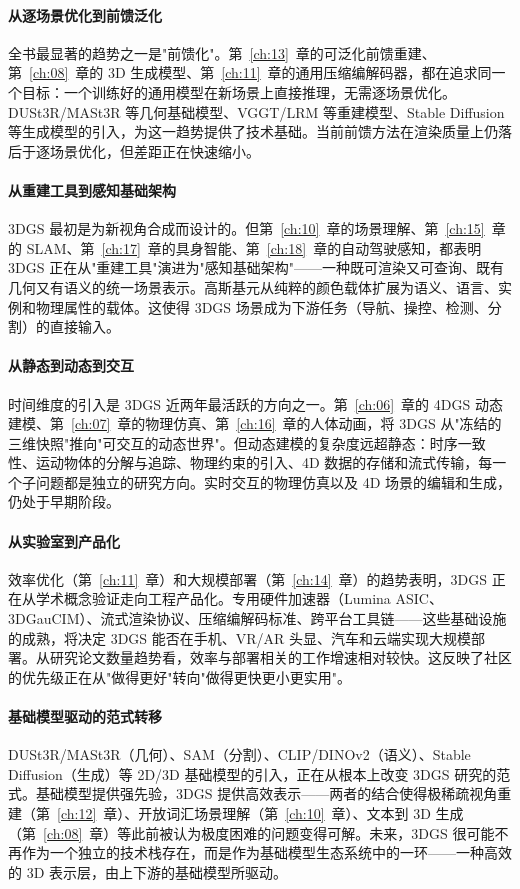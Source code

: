 \paragraph{从逐场景优化到前馈泛化}
全书最显著的趋势之一是"前馈化"。第~\ref{ch:13}~章的可泛化前馈重建、第~\ref{ch:08}~章的 3D 生成模型、第~\ref{ch:11}~章的通用压缩编解码器，都在追求同一个目标：一个训练好的通用模型在新场景上直接推理，无需逐场景优化。DUSt3R/MASt3R 等几何基础模型、VGGT/LRM 等重建模型、Stable Diffusion 等生成模型的引入，为这一趋势提供了技术基础。当前前馈方法在渲染质量上仍落后于逐场景优化，但差距正在快速缩小。

\paragraph{从重建工具到感知基础架构}
3DGS 最初是为新视角合成而设计的。但第~\ref{ch:10}~章的场景理解、第~\ref{ch:15}~章的 SLAM、第~\ref{ch:17}~章的具身智能、第~\ref{ch:18}~章的自动驾驶感知，都表明 3DGS 正在从"重建工具"演进为"感知基础架构"——一种既可渲染又可查询、既有几何又有语义的统一场景表示。高斯基元从纯粹的颜色载体扩展为语义、语言、实例和物理属性的载体。这使得 3DGS 场景成为下游任务（导航、操控、检测、分割）的直接输入。

\paragraph{从静态到动态到交互}
时间维度的引入是 3DGS 近两年最活跃的方向之一。第~\ref{ch:06}~章的 4DGS 动态建模、第~\ref{ch:07}~章的物理仿真、第~\ref{ch:16}~章的人体动画，将 3DGS 从"冻结的三维快照"推向"可交互的动态世界"。但动态建模的复杂度远超静态：时序一致性、运动物体的分解与追踪、物理约束的引入、4D 数据的存储和流式传输，每一个子问题都是独立的研究方向。实时交互的物理仿真以及 4D 场景的编辑和生成，仍处于早期阶段。

\paragraph{从实验室到产品化}
效率优化（第~\ref{ch:11}~章）和大规模部署（第~\ref{ch:14}~章）的趋势表明，3DGS 正在从学术概念验证走向工程产品化。专用硬件加速器（Lumina ASIC、3DGauCIM）、流式渲染协议、压缩编解码标准、跨平台工具链——这些基础设施的成熟，将决定 3DGS 能否在手机、VR/AR 头显、汽车和云端实现大规模部署。从研究论文数量趋势看，效率与部署相关的工作增速相对较快。这反映了社区的优先级正在从"做得更好"转向"做得更快更小更实用"。

\paragraph{基础模型驱动的范式转移}
DUSt3R/MASt3R（几何）、SAM（分割）、CLIP/DINOv2（语义）、Stable Diffusion（生成）等 2D/3D 基础模型的引入，正在从根本上改变 3DGS 研究的范式。基础模型提供强先验，3DGS 提供高效表示——两者的结合使得极稀疏视角重建（第~\ref{ch:12}~章）、开放词汇场景理解（第~\ref{ch:10}~章）、文本到 3D 生成（第~\ref{ch:08}~章）等此前被认为极度困难的问题变得可解。未来，3DGS 很可能不再作为一个独立的技术栈存在，而是作为基础模型生态系统中的一环——一种高效的 3D 表示层，由上下游的基础模型所驱动。


